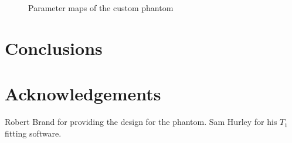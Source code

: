 \documentclass[journal]{IEEEtran}
\newlength\figureheight
\newlength\figurewidth
\begin{document}
\begin{figure}
\centering
\begin{minipage}[c]{\columnwidth}
\setlength{}
\setlength{}

\setlength{}
\setlength{}

\setlength{}
\setlength{}

\setlength{}
\setlength{}

    \caption{Parameter maps of the custom phantom}
    \label{fig:Jacklist3}
\end{minipage}
\end{figure}

\section{Conclusions}
\section{Acknowledgements}
Robert Brand for providing the design for the phantom. Sam Hurley for his $T_1$ fitting software.


\end{document}
